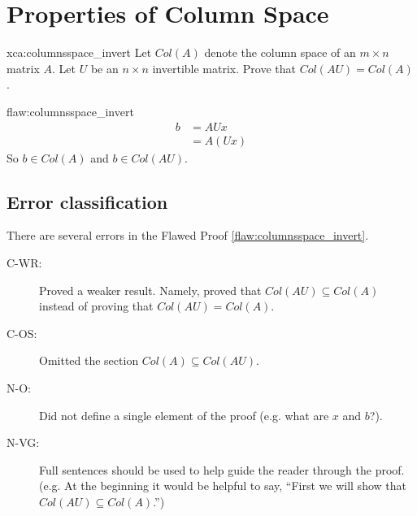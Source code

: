 \section{Properties of Column Space}

\begin{xca}{xca:columnsspace_invert}
Let $Col(A)$ denote the column space of an $m \times n$ matrix $A.$ Let $U$ be an $n\times n$ invertible matrix. Prove that $Col(AU) = Col(A)$.
\end{xca}

\begin{flaw}{flaw:columnsspace_invert} %
\begin{align*}
    b &= AUx \\
    &= A(Ux)
\end{align*}
So $b \in Col(A)$ and $b \in Col(AU)$.
\end{flaw}

\clearpage
\subsection{Error classification}


There are several errors
 in the Flawed Proof \ref{flaw:columnsspace_invert}. %


 \begin{description}
 	\item[C-WR:] Proved a weaker result. Namely, proved that $Col(AU) \subseteq Col(A)$ instead of proving that $Col(AU)=Col(A)$.
 	\item[C-OS:] Omitted the section $Col(A) \subseteq Col(AU)$.
 	\item[N-O:] Did not define a single element of the proof (e.g. what are $x$ and $b$?).
 	\item[N-VG:] Full sentences should be used to help guide the reader through the proof. (e.g. At the beginning it would be helpful to say, ``First we will show that $Col(AU) \subseteq Col(A)$.'')
 \end{description}


